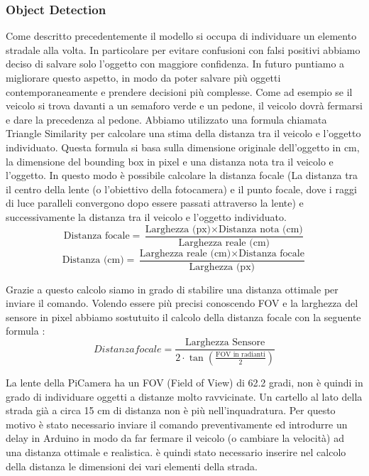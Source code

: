 \documentclass{article}
\begin{document}
    \subsubsection{Object Detection}
    Come descritto precedentemente il modello si occupa di individuare un elemento stradale alla volta. In particolare per evitare confusioni con falsi positivi abbiamo deciso di salvare solo l'oggetto con maggiore confidenza. In futuro puntiamo a migliorare questo aspetto, in modo da poter salvare più oggetti contemporaneamente e prendere decisioni più complesse. Come ad esempio se il veicolo si trova davanti a un semaforo verde e un pedone, il veicolo dovrà fermarsi e dare la precedenza al pedone.
    Abbiamo utilizzato una formula chiamata \cite{distanza} Triangle Similarity per calcolare una stima della distanza tra il veicolo e l'oggetto individuato. Questa formula si basa sulla dimensione originale dell'oggetto in cm, la dimensione del bounding box in pixel e una distanza nota tra il veicolo e l'oggetto. In questo modo è possibile calcolare la distanza focale (La distanza tra il centro della lente (o l'obiettivo della fotocamera) e il punto focale, dove i raggi di luce paralleli convergono dopo essere passati attraverso la lente) e successivamente la distanza tra il veicolo e l'oggetto individuato.  
    \[
    \text{Distanza focale} = \frac{\text{Larghezza (px)} \times \text{Distanza nota (cm)}}{\text{Larghezza reale (cm)}}
    \]
    \[
    \text{Distanza (cm)} = \frac{\text{Larghezza reale (cm)} \times \text{Distanza focale}}{\text{Larghezza (px)}}
    \]

    Grazie a questo calcolo siamo in grado di stabilire una distanza ottimale per inviare il comando. Volendo essere più precisi conoscendo FOV e la larghezza del sensore in pixel abbiamo sostutuito il calcolo della distanza focale con la seguente formula \cite{focallenght}:
    \[
    Distanza focale = \frac{\text{Larghezza Sensore}}{2 \cdot \tan\left( \frac{\text{FOV in radianti}}{2} \right)}
    \]

    La lente della PiCamera ha un FOV (Field of View) di 62.2 gradi, non è quindi in grado di individuare oggetti a distanze molto ravvicinate. Un cartello al lato della strada già a circa 15 cm di distanza non è più nell'inquadratura. Per questo motivo è stato necessario inviare il comando preventivamente ed introdurre un delay in Arduino in modo da far fermare il veicolo (o cambiare la velocità) ad una distanza ottimale e realistica. 
    è quindi stato necessario inserire nel calcolo della distanza le dimensioni dei vari elementi della strada.    
    
\end{document}

